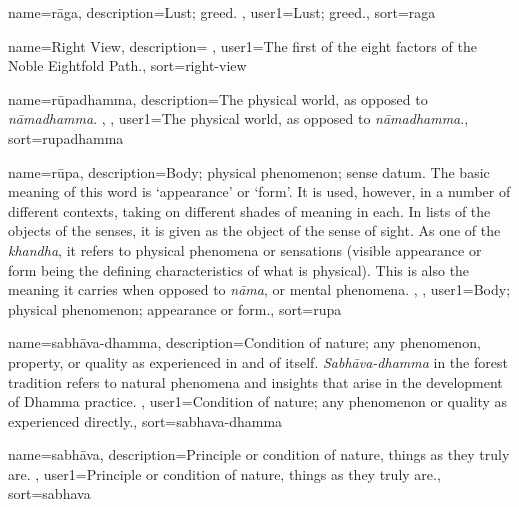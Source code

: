 {
name={r\=aga},
description={Lust; greed. \protect \seepre %
\protect {}%
\protect \seepost %
},
user1={Lust; greed.},
sort={raga}
}

{
name={Right View},
description={\nopostdesc \protect \seepre %
\protect {}%
\protect \seepost %
},
user1={The first of the eight factors of the Noble Eightfold Path.},
sort={right-view}
}

{
name=r\=upadhamma,
description={The physical world, as opposed to \textit{n\=amadhamma}. \protect \seepre %
\protect {}, \protect {}%
\protect \seepost %
},
user1={The physical world, as opposed to \textit{n\=amadhamma}.},
sort={rupadhamma}
}

{
name={r\=upa},
description={Body; physical phenomenon; sense datum. The basic meaning of this word is `appearance' or `form'. It is used, however, in a number of different contexts, taking on different shades of meaning in each. In lists of the objects of the senses, it is given as the object of the sense of sight. As one of the \textit{khandha}, it refers to physical phenomena or sensations (visible appearance or form being the defining characteristics of what is physical). This is also the meaning it carries when opposed to \textit{n\=ama}, or mental phenomena. \protect \seepre %
\protect {}, \protect {}%
\protect \seepost %
},
user1={Body; physical phenomenon; appearance or form.},
sort={rupa}
}

{
name={sabh\=ava-dhamma},
description={Condition of nature; any phenomenon, property, or quality as experienced in and of itself. \textit{Sabh\=ava-dhamma} in the forest tradition refers to natural phenomena and insights that arise in the development of Dhamma practice. \protect \seepre %
\protect {}%
\protect \seepost %
},
user1={Condition of nature; any phenomenon or quality as experienced directly.},
sort={sabhava-dhamma}
}

{
name=sabh\=ava,
description={Principle or condition of nature, things as they truly are. \protect \seepre %
\protect {}%
\protect \seepost %
},
user1={Principle or condition of nature, things as they truly are.},
sort={sabhava}
}

